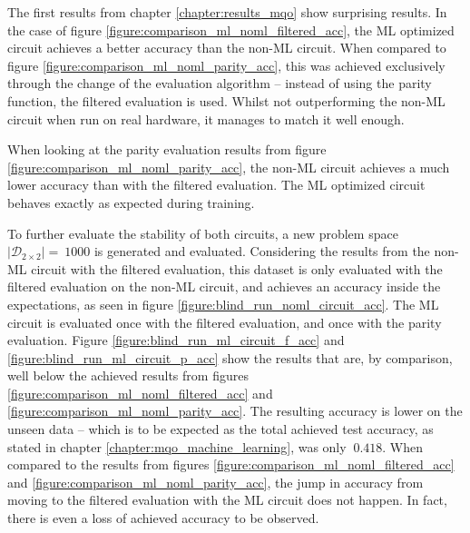 The first results from chapter \ref{chapter:results_mqo} show surprising results. In the case of figure \ref{figure:comparison_ml_noml_filtered_acc}, the ML optimized circuit achieves a better accuracy than the non-ML circuit. When compared to figure \ref{figure:comparison_ml_noml_parity_acc}, this was achieved exclusively through the change of the evaluation algorithm – instead of using the parity function, the filtered evaluation is used. Whilst not outperforming the non-ML circuit when run on real hardware, it manages to match it well enough.\par
When looking at the parity evaluation results from figure \ref{figure:comparison_ml_noml_parity_acc}, the non-ML circuit achieves a much lower accuracy than with the filtered evaluation. The ML optimized circuit behaves exactly as expected during training.\par
To further evaluate the stability of both circuits, a new problem space $\left|\mathcal{D}_{2\times2}\right| =\ 1000$ is generated and evaluated. Considering the results from the non-ML circuit with the filtered evaluation, this dataset is only evaluated with the filtered evaluation on the non-ML circuit, and achieves an accuracy inside the expectations, as seen in figure \ref{figure:blind_run_noml_circuit_acc}. The ML circuit is evaluated once with the filtered evaluation, and once with the parity evaluation. Figure \ref{figure:blind_run_ml_circuit_f_acc} and \ref{figure:blind_run_ml_circuit_p_acc} show the results that are, by comparison, well below the achieved results from figures \ref{figure:comparison_ml_noml_filtered_acc} and \ref{figure:comparison_ml_noml_parity_acc}. The resulting accuracy is lower on the unseen data – which is to be expected as the total achieved test accuracy, as stated in chapter \ref{chapter:mqo_machine_learning}, was only $~0.418$. When compared to the results from figures \ref{figure:comparison_ml_noml_filtered_acc} and \ref{figure:comparison_ml_noml_parity_acc}, the jump in accuracy from moving to the filtered evaluation with the ML circuit does not happen. In fact, there is even a loss of achieved accuracy to be observed. \par

